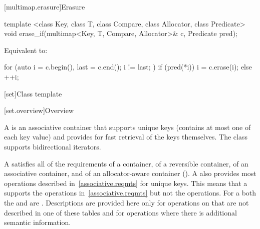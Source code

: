 [multimap.erasure]{Erasure}

%
\begin{itemdecl}
template <class Key, class T, class Compare, class Allocator, class Predicate>
  void erase_if(multimap<Key, T, Compare, Allocator>& c, Predicate pred);
\end{itemdecl}

\begin{itemdescr}
\pnum
\effects
Equivalent to:
\begin{codeblock}
for (auto i = c.begin(), last = c.end(); i != last; ) {
  if (pred(*i)) {
    i = c.erase(i);
  } else {
    ++i;
  }
}
\end{codeblock}
\end{itemdescr}

[set]{Class template }

[set.overview]{Overview}

\pnum
{}%
A
is an associative container that supports unique keys (contains at most one of each key value) and
provides for fast retrieval of the keys themselves.
The
 class
supports bidirectional iterators.

\pnum
A  satisfies all of the requirements of a container, of a reversible
container, of an associative
container, and of an allocator-aware container
().
A
also provides most operations described in~\ref{associative.reqmts}
for unique keys.
This means that a
supports the
operations in~\ref{associative.reqmts}
but not the
operations.
For a
both the
and
are
.
Descriptions are provided here only for operations on
that are not described in one of these tables
and for operations where there is additional semantic information.


